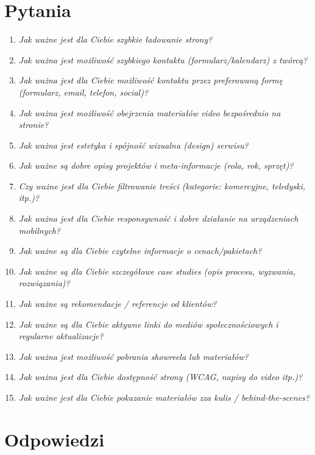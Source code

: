 \section{Pytania}
\begin{enumerate}
    \item \textit{Jak ważne jest dla Ciebie szybkie ładowanie strony?}
    \item \textit{Jak ważna jest możliwość szybkiego kontaktu (formularz/kalendarz) z twórcą?}
    \item \textit{Jak ważna jest dla Ciebie możliwość kontaktu przez preferowaną formę (formularz, email, telefon, social)?}
    \item \textit{Jak ważna jest możliwość obejrzenia materiałów video bezpośrednio na stronie?}
    \item \textit{Jak ważna jest estetyka i spójność wizualna (design) serwisu?}
    \item \textit{Jak ważne są dobre opisy projektów i meta-informacje (rola, rok, sprzęt)?}
    \item \textit{Czy ważne jest dla Ciebie filtrowanie treści (kategorie: komercyjne, teledyski, itp.)?}
    \item \textit{Jak ważna jest dla Ciebie responsywność i dobre działanie na urządzeniach mobilnych?}
    \item \textit{Jak ważne są dla Ciebie czytelne informacje o cenach/pakietach?}
    \item \textit{Jak ważne są dla Ciebie szczegółowe case studies (opis procesu, wyzwania, rozwiązania)?}
    \item \textit{Jak ważne są rekomendacje / referencje od klientów?}
    \item \textit{Jak ważne są dla Ciebie aktywne linki do mediów społecznościowych i regularne aktualizacje?}
    \item \textit{Jak ważna jest możliwość pobrania showreela lub materiałów?}
    \item \textit{Jak ważna jest dla Ciebie dostępność strony (WCAG, napisy do video itp.)?}
    \item \textit{Jak ważne jest dla Ciebie pokazanie materiałów zza kulis / behind-the-scenes?}
\end{enumerate}

\section{Odpowiedzi}

